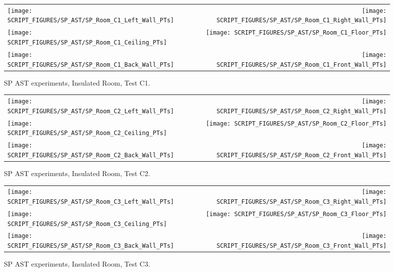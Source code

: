 \begin{figure}[p]
\begin{tabular*}{\textwidth}{l@{\extracolsep{\fill}}r}
\texttt{[image: SCRIPT\_FIGURES/SP\_AST/SP\_Room\_C1\_Left\_Wall\_PTs]} &  \texttt{[image: SCRIPT\_FIGURES/SP\_AST/SP\_Room\_C1\_Right\_Wall\_PTs]}  \\
\texttt{[image: SCRIPT\_FIGURES/SP\_AST/SP\_Room\_C1\_Ceiling\_PTs]}   &  \texttt{[image: SCRIPT\_FIGURES/SP\_AST/SP\_Room\_C1\_Floor\_PTs]}  \\
\texttt{[image: SCRIPT\_FIGURES/SP\_AST/SP\_Room\_C1\_Back\_Wall\_PTs]} &  \texttt{[image: SCRIPT\_FIGURES/SP\_AST/SP\_Room\_C1\_Front\_Wall\_PTs]}
\end{tabular*}
\caption[SP AST experiments, Insulated Room, Test C1]{SP AST experiments, Insulated Room, Test C1.}
\label{SP_Room_C1_PTs}
\end{figure}

\begin{figure}[p]
\begin{tabular*}{\textwidth}{l@{\extracolsep{\fill}}r}
\texttt{[image: SCRIPT\_FIGURES/SP\_AST/SP\_Room\_C2\_Left\_Wall\_PTs]} &  \texttt{[image: SCRIPT\_FIGURES/SP\_AST/SP\_Room\_C2\_Right\_Wall\_PTs]}  \\
\texttt{[image: SCRIPT\_FIGURES/SP\_AST/SP\_Room\_C2\_Ceiling\_PTs]}   &  \texttt{[image: SCRIPT\_FIGURES/SP\_AST/SP\_Room\_C2\_Floor\_PTs]}  \\
\texttt{[image: SCRIPT\_FIGURES/SP\_AST/SP\_Room\_C2\_Back\_Wall\_PTs]} &  \texttt{[image: SCRIPT\_FIGURES/SP\_AST/SP\_Room\_C2\_Front\_Wall\_PTs]}
\end{tabular*}
\caption[SP AST experiments, Insulated Room, Test C2]{SP AST experiments, Insulated Room, Test C2.}
\label{SP_Room_C2_PTs}
\end{figure}

\begin{figure}[p]
\begin{tabular*}{\textwidth}{l@{\extracolsep{\fill}}r}
\texttt{[image: SCRIPT\_FIGURES/SP\_AST/SP\_Room\_C3\_Left\_Wall\_PTs]} &  \texttt{[image: SCRIPT\_FIGURES/SP\_AST/SP\_Room\_C3\_Right\_Wall\_PTs]}  \\
\texttt{[image: SCRIPT\_FIGURES/SP\_AST/SP\_Room\_C3\_Ceiling\_PTs]}   &  \texttt{[image: SCRIPT\_FIGURES/SP\_AST/SP\_Room\_C3\_Floor\_PTs]}  \\
\texttt{[image: SCRIPT\_FIGURES/SP\_AST/SP\_Room\_C3\_Back\_Wall\_PTs]} &  \texttt{[image: SCRIPT\_FIGURES/SP\_AST/SP\_Room\_C3\_Front\_Wall\_PTs]}
\end{tabular*}
\caption[SP AST experiments, Insulated Room, Test C3]{SP AST experiments, Insulated Room, Test C3.}
\label{SP_Room_C3_PTs}
\end{figure}

